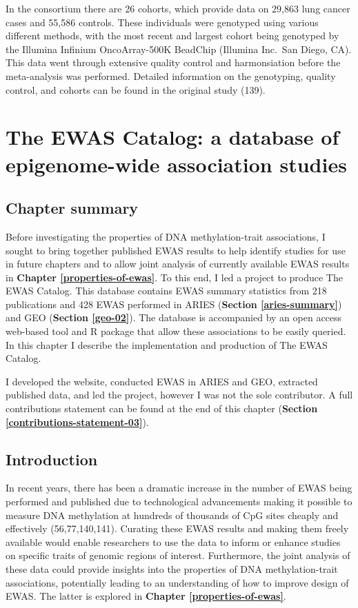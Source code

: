 \documentclass[11pt,oneside]{bristolthesis}
\begin{document}
In the consortium there are 26 cohorts, which provide data on 29,863 lung cancer cases and 55,586 controls. These individuals were genotyped using various different methods, with the most recent and largest cohort being genotyped by the Illumina Infinium OncoArray-500K BeadChip (Illumina Inc.~San Diego, CA). This data went through extensive quality control and harmonsiation before the meta-analysis was performed. Detailed information on the genotyping, quality control, and cohorts can be found in the original study (139).

\hypertarget{ewas-catalog}{%
\chapter{The EWAS Catalog: a database of epigenome-wide association studies}\label{ewas-catalog}}

\hypertarget{chapter-summary-03}{%
\section{Chapter summary}\label{chapter-summary-03}}

Before investigating the properties of DNA methylation-trait associations, I sought to bring together published EWAS results to help identify studies for use in future chapters and to allow joint analysis of currently available EWAS results in \textbf{Chapter \ref{properties-of-ewas}}. To this end, I led a project to produce The EWAS Catalog. This database contains EWAS summary statistics from 218 publications and 428 EWAS performed in ARIES (\textbf{Section \ref{aries-summary}}) and GEO (\textbf{Section \ref{geo-02}}). The database is accompanied by an open access web-based tool and R package that allow these associations to be easily queried. In this chapter I describe the implementation and production of The EWAS Catalog.

I developed the website, conducted EWAS in ARIES and GEO, extracted published data, and led the project, however I was not the sole contributor. A full contributions statement can be found at the end of this chapter (\textbf{Section \ref{contributions-statement-03}}).

\hypertarget{introduction-03}{%
\section{Introduction}\label{introduction-03}}

In recent years, there has been a dramatic increase in the number of EWAS being performed and published due to technological advancements making it possible to measure DNA methylation at hundreds of thousands of CpG sites cheaply and effectively (56,77,140,141). Curating these EWAS results and making them freely available would enable researchers to use the data to inform or enhance studies on specific traits of genomic regions of interest. Furthermore, the joint analysis of these data could provide insights into the properties of DNA methylation-trait associations, potentially leading to an understanding of how to improve design of EWAS. The latter is explored in \textbf{Chapter \ref{properties-of-ewas}}.
\end{document}
